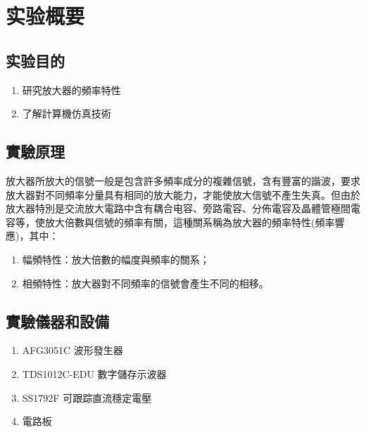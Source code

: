 \documentclass[a4paper]{article}
\begin{document}


\section{实验概要}
\subsection{实验目的}
\begin{enumerate}
	\item 研究放大器的頻率特性
	\item 了解計算機仿真技術
\end{enumerate}
\subsection{實驗原理}
\hspace{2em}放大器所放大的信號一般是包含許多頻率成分的複雜信號，含有豐富的諧波，要求放大器對不同頻率分量具有相同的放大能力，才能使放大信號不產生失真。但由於放大器特別是交流放大電路中含有耦合电容、旁路電容、分佈電容及晶體管極間電容等，使放大倍數與信號的頻率有關，這種關系稱為放大器的頻率特性(頻率響應)，其中：\par
\begin{enumerate}
    \item 幅頻特性：放大倍數的幅度與頻率的關系；
    \item 相頻特性：放大器對不同頻率的信號會產生不同的相移。
\end{enumerate}
\subsection{實驗儀器和設備}
\begin{enumerate}
    \item AFG3051C 波形發生器
    \item TDS1012C-EDU 數字儲存示波器
    \item SS1792F 可跟踪直流穩定電壓
    \item 電路板
\end{enumerate}
\clearpage
\end{document}
